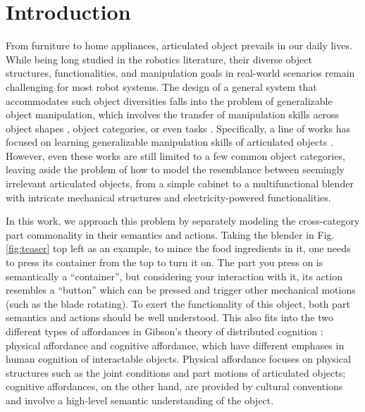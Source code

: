 \section{Introduction}

From furniture to home appliances, articulated object prevails in our daily lives.
While being long studied in the robotics literature, their diverse object structures, functionalities, and manipulation goals in real-world scenarios remain challenging for most robot systems.
%
The design of a general system that accommodates such object diversities falls into the problem of generalizable object manipulation, which involves the transfer of manipulation skills across object shapes \citep{mu2021maniskill, gu2023maniskill2}, object categories\citep{geng2022gapartnet, geng2023partmanip, xu2023unidexgrasp, wan2023unidexgrasp++}, or even tasks \citep{yu2021metaworld}.
Specifically, a line of works has focused on learning generalizable manipulation skills of articulated objects \citep{mu2021maniskill, gu2023maniskill2, geng2022gapartnet, geng2023partmanip, gong2023arnold, geng2022end}.
%
However, even these works are still limited to a few common object categories, leaving aside the problem of how to model the resemblance between seemingly irrelevant articulated objects, from a simple cabinet to a multifunctional blender with intricate mechanical structures and electricity-powered functionalities.


In this work, we approach this problem by separately modeling the cross-category part commonality in their semantics and actions. Taking the blender in Fig. \ref{fig:teaser} top left as an example, to mince the food ingredients in it, one needs to press its container from the top to turn it on.
%
The part you press on is semantically a ``container'', but considering your interaction with it, its action resembles a ``button'' which can be pressed and trigger other mechanical motions (such as the blade rotating). To exert the functionality of this object, both part semantics and actions should be well understood.
%
This also fits into the two different types of affordances in Gibson's theory of distributed cognition \citep{zhang2006distributed}: physical affordance and cognitive affordance, which have different emphases in human cognition of interactable objects. Physical affordance focuses on physical structures such as the joint conditions and part motions of articulated objects; cognitive affordances, on the other hand, are provided by cultural conventions and involve a high-level semantic understanding of the object.


